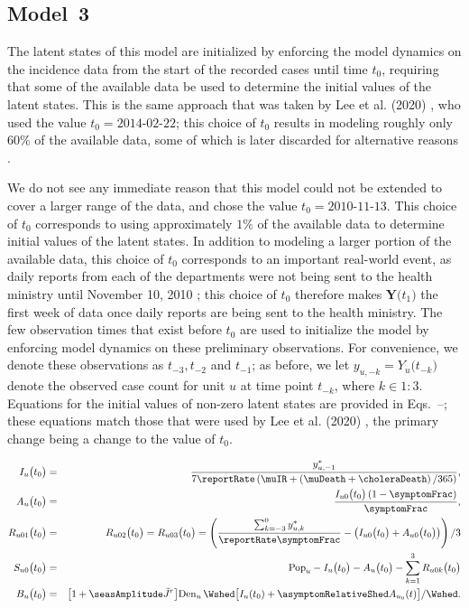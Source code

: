 \subsection{Model~3}

The latent states of this model are initialized by enforcing the model dynamics on the incidence data from the start of the recorded cases until time $t_0$, requiring that some of the available data be used to determine the initial values of the latent states.
This is the same approach that was taken by Lee et al. (2020) \cite{lee20}, who used the value $t_0 = \text{2014-02-22}$; this choice of $t_0$ results in modeling roughly only $60\%$ of the available data, some of which is later discarded for alternative reasons \cite{lee20sup}.

We do not see any immediate reason that this model could not be extended to cover a larger range of the data, and chose the value $t_0 = \text{2010-11-13}$.
This choice of $t_0$ corresponds to using approximately $1\%$ of the available data to determine initial values of the latent states.
In addition to modeling a larger portion of the available data, this choice of $t_0$ corresponds to an important real-world event, as daily reports from each of the departments were not being sent to the health ministry until November 10, 2010 \cite{barzilay13};
this choice of $t_0$ therefore makes $\bm{Y}\big(t_1\big)$ the first week of data once daily reports are being sent to the health ministry.
The few observation times that exist before $t_0$ are used to initialize the model by enforcing model dynamics on these preliminary observations.
For convenience, we denote these observations as $t_{-3}, t_{-2}$ and $t_{-1}$; as before, we let $y_{u,-k} = Y_{u}\big(t_{-k}\big)$ denote the observed case count for unit $u$ at time point $t_{-k}$, where $k \in 1:3$.
Equations for the initial values of non-zero latent states are provided in Eqs.~--; these equations match those that were used by Lee et al. (2020) \cite{lee20}, the primary change being a change to the value of $t_0$.

\begin{eqnarray}
\label{eq:model3:I0}
I_{u}\big(t_0\big) &=& \frac{y^*_{u, -1}}{7\reportRate\left(\muIR + \left(\muDeath + \choleraDeath\right)/365\right)},
\\%
\label{eq:model3:A0}
A_{u}\big(t_0\big) &=& \frac{I_{u0}\big(t_0\big)\left(1 - \symptomFrac\right)}{\symptomFrac},
\\
\label{eq:model3:R0}
R_{u01}\big(t_0\big) &=& R_{u02}\big(t_0\big) = R_{u03}\big(t_0\big) = \left(\frac{\sum_{k = -3}^0 y^*_{u, k}}{\reportRate \symptomFrac} - \left(I_{u0}\big(t_0\big) + A_{u0}\big(t_0\big)\right)\right) / 3
\\
\label{eq:model3:S0}
S_{u0}\big(t_0\big) &=& \mathrm{Pop}_u - I_{u}\big(t_0\big) - A_{u}\big(t_0\big) - \sum_{k=1}^3 R_{u0k}\big(t_0\big)
\\
\label{eq:model3:B0}
B_{u}\big(t_0\big) &=& \big[1 + \seasAmplitude \tilde{J}^r \big] \mathrm{Den}_u \, \Wshed \big[ I_{u}(t_0)+ \asymptomRelativeShed A_{u_0}(t) \big]/\Wshed.
\end{eqnarray}

